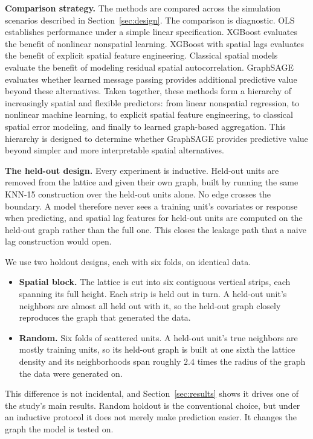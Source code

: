 \documentclass[ASNA, twocolumn]{USG} %
\begin{document}
\noindent \textbf{Comparison strategy.}
The methods are compared across the simulation scenarios described in Section~\ref{sec:design}. The comparison is diagnostic. OLS establishes performance under a simple linear specification. XGBoost evaluates the benefit of nonlinear nonspatial learning. XGBoost with spatial lags evaluates the benefit of explicit spatial feature engineering. Classical spatial models evaluate the benefit of modeling residual spatial autocorrelation. GraphSAGE evaluates whether learned message passing provides additional predictive value beyond these alternatives.
Taken together, these methods form a hierarchy of increasingly spatial and flexible predictors: from linear nonspatial regression, to nonlinear machine learning, to explicit spatial feature engineering, to classical spatial error modeling, and finally to learned graph-based aggregation. This hierarchy is designed to determine whether GraphSAGE provides predictive value beyond simpler and more interpretable spatial alternatives.

\noindent \textbf{The held-out design.}
Every experiment is inductive. Held-out units are removed from the lattice and given their own graph, built by running the same KNN-15 construction over the held-out units alone. No edge crosses the boundary. A model therefore never sees a training unit's covariates or response when predicting, and spatial lag features for held-out units are computed on the held-out graph rather than the full one. This closes the leakage path that a naive lag construction would open.

We use two holdout designs, each with six folds, on identical data.

\begin{itemize}
\item \textbf{Spatial block.} The lattice is cut into six contiguous vertical strips, each spanning its full height. Each strip is held out in turn. A held-out unit's neighbors are almost all held out with it, so the held-out graph closely reproduces the graph that generated the data.
\item \textbf{Random.} Six folds of scattered units. A held-out unit's true neighbors are mostly training units, so its held-out graph is built at one sixth the lattice density and its neighborhoods span roughly \(2.4\) times the radius of the graph the data were generated on.
\end{itemize}

This difference is not incidental, and Section~\ref{sec:results} shows it drives one of the study's main results. Random holdout is the conventional choice, but under an inductive protocol it does not merely make prediction easier. It changes the graph the model is tested on.
\end{document}
